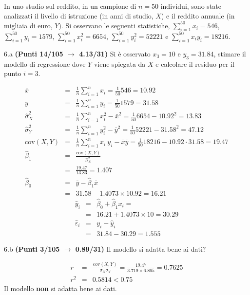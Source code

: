 \documentclass[
  11pt,
]{book}
\theoremstyle{mytheoremstyle}
\theoremstyle{mydefstyle}
\newenvironment{sol}
  {
  \begin{tcolorbox}[enhanced,breakable,arc=0.1mm,boxrule=1pt,colback=white,colframe=iblue,
  title=\bf \fontfamily{lmss}\selectfont \hspace{.5 cm} Soluzione,drop fuzzy shadow]

}{
\end{tcolorbox}
  }
\begin{document}
In uno studio sul reddito, in un campione di \(n=50\) individui, sono state analizzati il livello di istruzione (in anni di studio, \(X\)) e il reddito annuale (in migliaia di euro, \(Y\)).
Si osservano le seguenti statistiche, \(\sum_{i=1}^{50}x_i=546\), \(\sum_{i=1}^{50}y_i=1579\),
\(\sum_{i=1}^{50}x_i^2=6654\), \(\sum_{i=1}^{50}y_i^2=52221\) e \(\sum_{i=1}^{50}x_iy_i=18216\).

6.a \textbf{(Punti 14/105 \(\rightarrow\) 4.13/31)} Si è osservato \(x_3=10\) e \(y_3=31.84\), stimare il modello di regressione dove \(Y\) viene spiegata da \(X\) e calcolare il residuo per il punto \(i=3\).

\begin{sol}
\begin{eqnarray*}
           \bar x &=&\frac 1 n\sum_{i=1}^n x_i = \frac {1}{ 50 }  546 =  10.92 \\
           \bar y &=&\frac 1 n\sum_{i=1}^n y_i = \frac {1}{ 50 }  1579 =  31.58 \\
           \hat\sigma_X^2&=&\frac 1 n\sum_{i=1}^n x_i^2-\bar x^2=\frac {1}{ 50 }  6654  - 10.92 ^2= 13.83 \\
           \hat\sigma_Y^2&=&\frac 1 n\sum_{i=1}^n y_i^2-\bar y^2=\frac {1}{ 50 }  52221  - 31.58 ^2= 47.12 \\
           \text{cov}(X,Y)&=&\frac 1 n\sum_{i=1}^n x_i~y_i-\bar x\bar y=\frac {1}{ 50 }  18216 - 10.92 \cdot 31.58 = 19.47 \\
           \hat\beta_1 &=& \frac{\text{cov}(X,Y)}{\hat\sigma_X^2} \\
                    &=& \frac{ 19.47 }{ 13.83 }  =  1.407 \\
           \hat\beta_0 &=& \bar y - \hat\beta_1 \bar x\\
                    &=&  31.58 - 1.4073 \times  10.92 = 16.21 
         \end{eqnarray*}\begin{eqnarray*}
\hat y_i &=&\hat\beta_0+\hat\beta_1 x_i=\\ 
&=& 16.21 + 1.4073 \times 10 = 30.29 \\ 
\hat \varepsilon_i &=& y_i-\hat y_i\\ 
&=& 31.84 - 30.29 = 1.555  
\end{eqnarray*}

\end{sol}

6.b \textbf{(Punti 3/105 \(\rightarrow\) 0.89/31)} Il modello si adatta bene ai dati?

\begin{sol}
\begin{eqnarray*}
r&=&\frac{\text{cov}(X,Y)}{\sigma_X\sigma_Y}=\frac{ 19.47 }{ 3.719 \times 6.865 }= 0.7625 \\r^2&=& 0.5814 < 0.75
\end{eqnarray*}
Il modello \textbf{non} si adatta bene ai dati.

\end{sol}
\end{document}
